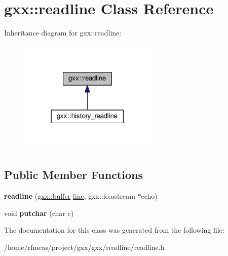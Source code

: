 \hypertarget{classgxx_1_1readline}{}\section{gxx\+:\+:readline Class Reference}
\label{classgxx_1_1readline}


Inheritance diagram for gxx\+:\+:readline\+:
\nopagebreak
\begin{figure}[H]
\begin{center}
\leavevmode
\includegraphics[width=187pt]{classgxx_1_1readline__inherit__graph}
\end{center}
\end{figure}
\subsection*{Public Member Functions}
\begin{DoxyCompactItemize}
\item 
{\bfseries readline} (\hyperlink{classgxx_1_1buffer}{gxx\+::buffer} \hyperlink{classgxx_1_1line}{line}, gxx\+::io\+:ostream $\ast$echo)\hypertarget{classgxx_1_1readline_a652a883d3e5ec482ad403aaa12a0c621}{}\label{classgxx_1_1readline_a652a883d3e5ec482ad403aaa12a0c621}

\item 
void {\bfseries putchar} (char c)\hypertarget{classgxx_1_1readline_a4cb847758839e20b3b5b8430139ea714}{}\label{classgxx_1_1readline_a4cb847758839e20b3b5b8430139ea714}

\end{DoxyCompactItemize}


The documentation for this class was generated from the following file\+:\begin{DoxyCompactItemize}
\item 
/home/rfmeas/project/gxx/gxx/readline/readline.\+h\end{DoxyCompactItemize}
